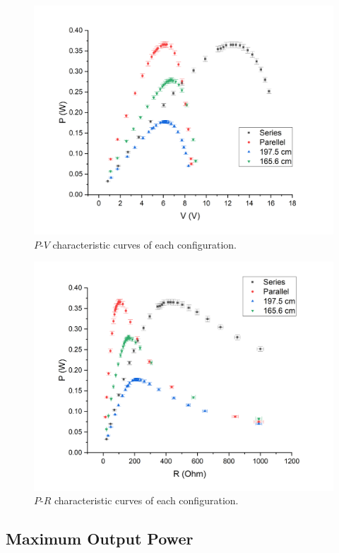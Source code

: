 \documentclass{article}
\begin{document}
{\begin{figure}[H]\centering
    \includegraphics[scale=0.4]{P.png}
    \caption{$P$-$V$ characteristic curves of each configuration.}\label{FigP}
\end{figure}



\begin{figure}[H]\centering
    \includegraphics[scale=0.4]{R.png}
    \caption{$P$-$R$ characteristic curves of each configuration.}\label{FigR}
\end{figure}


\subsection{Maximum Output Power}

}
\end{document}
